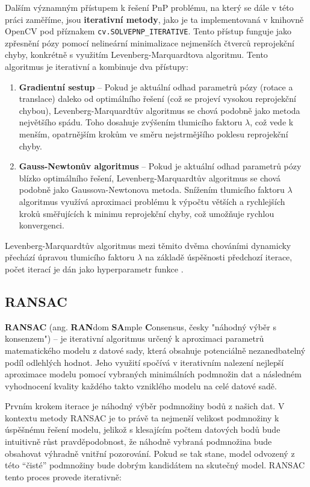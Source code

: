 Dalším významným přístupem k řešení PnP problému, na který se dále v této práci zaměříme, jsou \textbf{iterativní metody}, jako je ta implementovaná v knihovně OpenCV pod příznakem \texttt{cv.SOLVEPNP\_ITERATIVE}. Tento přístup funguje jako zpřesnění pózy pomocí nelineární minimalizace nejmenších čtverců reprojekční chyby, konkrétně s využitím Levenberg-Marquardtova algoritmu. Tento algoritmus je iterativní a kombinuje dva přístupy:
\begin{enumerate}
    \item \textbf{Gradientní sestup} -- Pokud je aktuální odhad parametrů pózy (rotace a translace) daleko od optimálního řešení (což se projeví vysokou reprojekční chybou), Levenberg-Marquardtův algoritmus se chová podobně jako metoda největšího spádu. Toho dosahuje zvýšením tlumicího faktoru $\lambda$, což vede k menším, opatrnějším krokům ve směru nejstrmějšího poklesu reprojekční chyby.
    \item \textbf{Gauss-Newtonův algoritmus} -- Pokud je aktuální odhad parametrů pózy blízko optimálního řešení, Levenberg-Marquardtův algoritmus se chová podobně jako Gaussova-Newtonova metoda. Snížením tlumicího faktoru $\lambda$ algoritmus využívá aproximaci problému k výpočtu větších a rychlejších kroků směřujících k minimu reprojekční chyby, což umožňuje rychlou konvergenci.
\end{enumerate}
Levenberg-Marquardtův algoritmus mezi těmito dvěma chováními dynamicky přechází úpravou tlumicího faktoru $\lambda$ na základě úspěšnosti předchozí iterace, počet iterací je dán jako hyperparametr funkce \cite{pnpransaclmalg}.

\subsection{RANSAC}
\textbf{RANSAC} (ang. \textbf{RAN}dom \textbf{SA}mple \textbf{C}onsensus, česky "náhodný výběr s konsenzem") -- je iterativní algoritmus určený k aproximaci parametrů matematického modelu z datové sady, která obsahuje potenciálně nezanedbatelný podíl odlehlých hodnot. Jeho využití spočívá v iterativním nalezení nejlepší aproximace modelu pomocí vybraných minimálních podmnožin dat a následném vyhodnocení kvality každého takto vzniklého modelu na celé datové sadě.

Prvním krokem iterace je náhodný výběr podmnožiny bodů z našich dat. V kontextu metody RANSAC je to právě ta nejmenší velikost podmnožiny k úspěšnému řešení modelu, jelikož s klesajícím počtem datových bodů bude intuitivně růst pravděpodobnost, že náhodně vybraná podmnožina bude obsahovat výhradně vnitřní pozorování. Pokud se tak stane, model odvozený z této \enquote{čisté} podmnožiny bude dobrým kandidátem na skutečný model. RANSAC tento proces provede iterativně:

